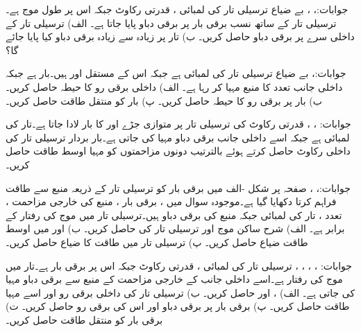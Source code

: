 جوابات:، ، 
بے ضیاع ترسیلی تار کی لمبائی ، قدرتی رکاوٹ  جبکہ اس  پر طول موج  ہے۔ترسیلی تار کے ساتھ نسب برقی بار  پر  برقی دباو پایا جاتا ہے۔ الف) ترسیلی تار کے داخلی سرے پر برقی دباو حاصل کریں۔ ب) تار پر زیادہ سے زیادہ برقی دباو کیا پایا جائے گا؟

جوابات:، 
بے ضیاع ترسیلی تار کی لمبائی  ہے جبکہ اس کے مستقل  اور  ہیں۔بار  ہے جبکہ داخلی جانب  تعدد کا منبع  مہیا کر رہا ہے۔ الف) داخلی برقی رو کا حیطہ حاصل کریں۔ ب) بار پر برقی رو کا حیطہ حاصل کریں۔ پ) بار کو منتقل طاقت حاصل کریں۔

جوابات: ، ، 
 قدرتی رکاوٹ کی ترسیلی تار پر متوازی جڑے  اور  کا بار لادا جاتا ہے۔تار کی لمبائی  ہے جبکہ اسے داخلی جانب  برقی دباو مہیا کی جاتی ہے۔بار بردار ترسیلی تار کی داخلی رکاوٹ  حاصل کرتے ہوئے  بالترتیب دونوں مزاحمتوں کو مہیا اوسط طاقت حاصل کریں۔

جوابات:، ، 
صفحہ  پر شکل -الف میں برقی بار کو ترسیلی تار کے ذریعہ منبع سے طاقت فراہم کرتا دکھایا گیا ہے۔موجودہ سوال میں ، برقی  بار ، منبع کی خارجی مزاحمت ، تعدد ، تار کی لمبائی  جبکہ منبع کی برقی دباو  ہیں۔ترسیلی تار میں موج کی رفتار  کے برابر ہے۔ الف) شرح ساکن موج  اور ترسیلی تار کی  حاصل کریں۔ ب)   اور  میں اوسط طاقت ضیاع حاصل کریں۔  پ) ترسیلی تار میں طاقت کا ضیاع حاصل کریں۔   

جوابات: ، ، ، ، 
ترسیلی تار کی لمبائی ، قدرتی رکاوٹ  جبکہ اس پر برقی بار  ہے۔تار میں موج کی رفتار  ہے۔اسے داخلی جانب  کے خارجی مزاحمت کے منبع سے  برقی دباو مہیا کی جاتی ہے۔ الف) ،  اور  حاصل کریں۔ ب) ترسیلی تار کی داخلی برقی رو اور اسے مہیا طاقت حاصل کریں۔ پ)  برقی بار پر برقی دباو اور اس کی برقی رو حاصل کریں۔ ت) برقی بار کو منتقل طاقت حاصل کریں۔

